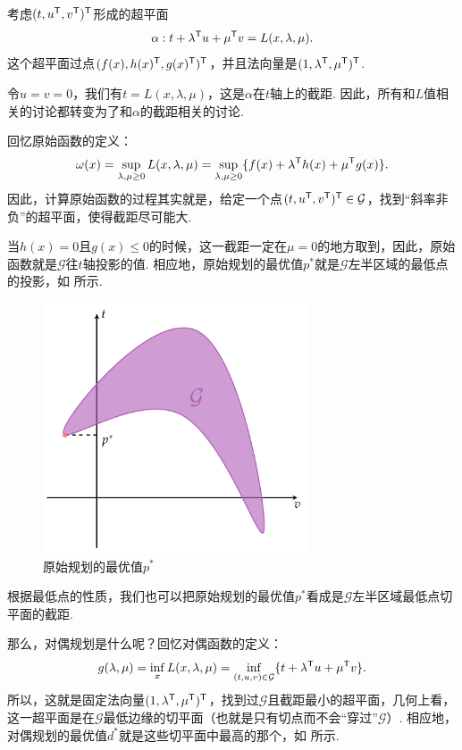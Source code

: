 考虑$(t,u^{\mathsf{T}},v^{\mathsf{T}})^{\mathsf{T}}$形成的超平面
\[\alpha: t+\lambda^{\mathsf{T}} u+\mu^{\mathsf{T}} v= L(x,\lambda,\mu).\]
这个超平面过点$(f(x),h(x)^{\mathsf{T}},g(x)^{\mathsf{T}})^{\mathsf{T}}$，并且法向量是$(1,\lambda^{\mathsf{T}},\mu^{\mathsf{T}})^{\mathsf{T}}$. 

令$u=v=0$，我们有$t=L(x,\lambda,\mu)$，这是$\alpha$在$t$轴上的截距. 因此，所有和$L$值相关的讨论都转变为了和$\alpha$的截距相关的讨论.

回忆原始函数的定义：
\[
\omega(x)=\sup_{\lambda,\mu\geq 0} L(x,\lambda,\mu)=\sup_{\lambda,\mu\geq 0}\{f(x)+\lambda^{\mathsf{T}} h(x)+\mu^{\mathsf{T}} g(x)\}.
\]
因此，计算原始函数的过程其实就是，给定一个点$(t,u^{\mathsf{T}},v^{\mathsf{T}})^{\mathsf{T}}\in \mathcal{G}$，找到“斜率非负”的超平面，使得截距尽可能大. 

当$h(x)=0$且$g(x)\leq 0$的时候，这一截距一定在$\mu=0$的地方取到，因此，原始函数就是$\mathcal{G}$往$t$轴投影的值. 相应地，原始规划的最优值$p^*$就是$\mathcal{G}$左半区域的最低点的投影，如 所示.

\begin{figure}[htbp]
    \centering
    \includegraphics[width=0.7\textwidth]{figures/duality/duality-primal-p-star.pdf}
    \caption{原始规划的最优值$p^*$}
    \label{fig:duality-primal-p-star}
\end{figure}

根据最低点的性质，我们也可以把原始规划的最优值$p^*$看成是$\mathcal{G}$左半区域最低点切平面的截距.

那么，对偶规划是什么呢？回忆对偶函数的定义：
\[g(\lambda,\mu)=\inf_{x} L(x,\lambda,\mu)=\inf_{(t,u,v)\in\mathcal{G}}\{t+\lambda^{\mathsf{T}} u+\mu^{\mathsf{T}} v\}.\]
所以，这就是固定法向量$(1,\lambda^{\mathsf{T}},\mu^{\mathsf{T}})^{\mathsf{T}}$，找到过$\mathcal{G}$且截距最小的超平面，几何上看，这一超平面是在$\mathcal{G}$最低边缘的切平面（也就是只有切点而不会“穿过”$\mathcal{G}$）. 相应地，对偶规划的最优值$d^*$就是这些切平面中最高的那个，如 所示.

